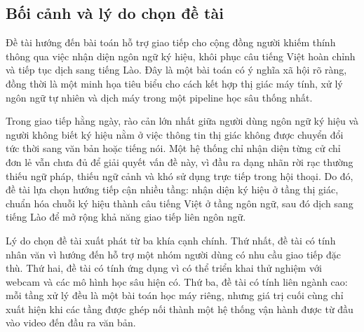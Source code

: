 ﻿\subsection{Bối cảnh và lý do chọn đề tài}

Đề tài hướng đến bài toán hỗ trợ giao tiếp cho cộng đồng người khiếm thính thông qua việc nhận diện ngôn ngữ ký hiệu, khôi phục câu tiếng Việt hoàn chỉnh và tiếp tục dịch sang tiếng Lào. Đây là một bài toán có ý nghĩa xã hội rõ ràng, đồng thời là một minh họa tiêu biểu cho cách kết hợp thị giác máy tính, xử lý ngôn ngữ tự nhiên và dịch máy trong một pipeline học sâu thống nhất.

Trong giao tiếp hằng ngày, rào cản lớn nhất giữa người dùng ngôn ngữ ký hiệu và người không biết ký hiệu nằm ở việc thông tin thị giác không được chuyển đổi tức thời sang văn bản hoặc tiếng nói. Một hệ thống chỉ nhận diện từng cử chỉ đơn lẻ vẫn chưa đủ để giải quyết vấn đề này, vì đầu ra dạng nhãn rời rạc thường thiếu ngữ pháp, thiếu ngữ cảnh và khó sử dụng trực tiếp trong hội thoại. Do đó, đề tài lựa chọn hướng tiếp cận nhiều tầng: nhận diện ký hiệu ở tầng thị giác, chuẩn hóa chuỗi ký hiệu thành câu tiếng Việt ở tầng ngôn ngữ, sau đó dịch sang tiếng Lào để mở rộng khả năng giao tiếp liên ngôn ngữ.

Lý do chọn đề tài xuất phát từ ba khía cạnh chính. Thứ nhất, đề tài có tính nhân văn vì hướng đến hỗ trợ một nhóm người dùng có nhu cầu giao tiếp đặc thù. Thứ hai, đề tài có tính ứng dụng vì có thể triển khai thử nghiệm với webcam và các mô hình học sâu hiện có. Thứ ba, đề tài có tính liên ngành cao: mỗi tầng xử lý đều là một bài toán học máy riêng, nhưng giá trị cuối cùng chỉ xuất hiện khi các tầng được ghép nối thành một hệ thống vận hành được từ đầu vào video đến đầu ra văn bản.

